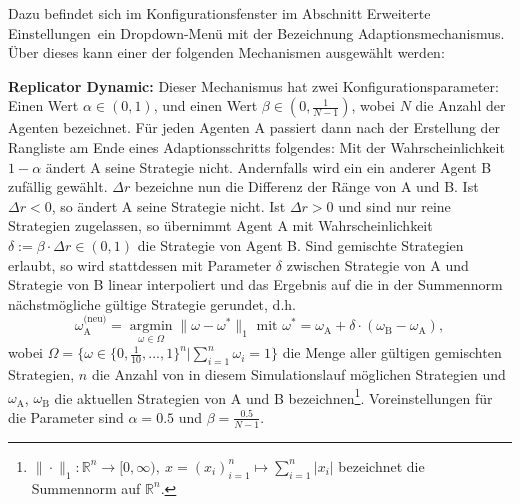 \documentclass[parskip=full,11pt]{scrartcl}
\def\adapt{Adaptionsschritt}
\begin{document}
Dazu befindet sich im Konfigurationsfenster im Abschnitt \glqq Erweiterte Einstellungen\grqq\ ein Dropdown-Menü mit der Bezeichnung \glqq Adaptionsmechanismus\grqq. Über dieses kann einer der folgenden Mechanismen ausgewählt werden:

\textbf{Replicator Dynamic:}
Dieser Mechanismus hat zwei Konfigurationsparameter: Einen Wert \(\alpha \in (0,1)\), und einen Wert \(\beta \in (0,\frac{1}{N-1})\), wobei \(N\) die Anzahl der Agenten bezeichnet. Für jeden Agenten A passiert dann nach der Erstellung der Rangliste am Ende eines \adapt s folgendes: Mit der Wahrscheinlichkeit \(1 - \alpha\) ändert A seine Strategie nicht. Andernfalls wird ein ein anderer Agent B zufällig gewählt. \(\Delta r\) bezeichne nun die Differenz der Ränge von A und B. Ist \(\Delta r < 0\), so ändert A seine Strategie nicht. Ist \(\Delta r > 0\) und sind nur reine Strategien zugelassen, so übernimmt Agent A mit Wahrscheinlichkeit \(\delta := \beta \cdot \Delta r \in (0,1)\) die Strategie von Agent B. Sind gemischte Strategien erlaubt, so wird stattdessen mit Parameter \(\delta\) zwischen Strategie von A und Strategie von B linear interpoliert und das Ergebnis auf die in der Summennorm nächstmögliche gültige Strategie gerundet, d.h.
\[
\omega_\text{A}^\text{(neu)} = \underset{\omega \in \Omega}{\operatorname{arg min}} \|\omega - \omega^*\|_1 \text{  mit  } \omega^* = \omega_\text{A} + \delta \cdot (\omega_\text{B} - \omega_\text{A}),
\]
wobei \(\Omega = \{\omega \in \{0,\frac{1}{10},...,1\}^n | \sum_{i=1}^n \omega_i = 1\}\) die Menge aller gültigen gemischten Strategien, \(n\) die Anzahl von in diesem Simulationslauf möglichen Strategien und \(\omega_\text{A}\), \(\omega_\text{B}\) die aktuellen Strategien von A und B bezeichnen\footnote{\(\|\cdot\|_1 : \mathbb{R}^n \rightarrow [0,\infty), \ x = (x_i)_{i=1}^n \mapsto \sum_{i=1}^n |x_i|\) bezeichnet die Summennorm auf \(\mathbb{R}^n\).}. Voreinstellungen für die Parameter sind \(\alpha = 0.5\) und \(\beta = \frac{0.5}{N - 1}\).
\end{document}
